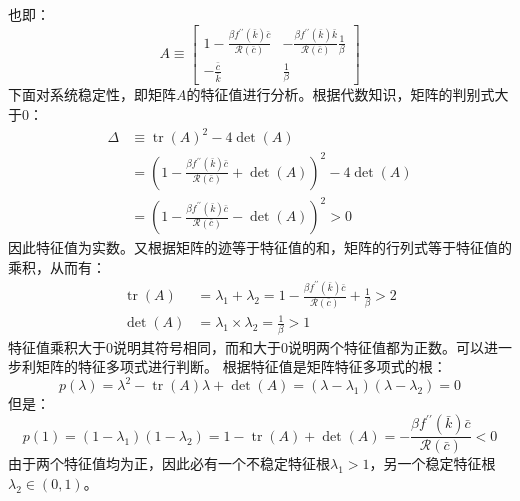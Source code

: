 也即：
\[
    A \equiv
    \begin{bmatrix}
        1-\frac{\beta f^{\prime \prime}(\bar{k}) \bar{c}}{\mathcal{R}(\bar{c})} &
        - \frac{\beta f^{\prime \prime}(\bar{k}) \bar{k}}{\mathcal{R}(\bar{c})} \frac{1}{\beta} \\
        -\frac{\bar{c}}{\bar{k}} & \frac{1}{\beta}
    \end{bmatrix}
\]
下面对系统稳定性，即矩阵$A$的特征值进行分析。根据代数知识，矩阵的判别式大于0：
\begin{equation}
    \begin{aligned}
        \Delta & \equiv \operatorname{tr}(A)^2-4 \operatorname{det}(A) \\
        & =\left(1-\frac{\beta f^{\prime \prime}(\bar{k}) \bar{c}}{\mathcal{R}(\bar{c})}
            +\operatorname{det}(A)\right)^2-4 \operatorname{det}(A) \\
        & =\left(1-\frac{\beta f^{\prime \prime}(\bar{k}) \bar{c}}{\mathcal{R}(\bar{c})}
            -\operatorname{det}(A)\right)^2>0
    \end{aligned}
\end{equation}
因此特征值为实数。又根据矩阵的迹等于特征值的和，矩阵的行列式等于特征值的乘积，从而有：
\begin{equation}
    \begin{aligned}
        \operatorname{tr}(A) & =\lambda_1+\lambda_2 = 
            1-\frac{\beta f^{\prime \prime}(\bar{k}) \bar{c}}{\mathcal{R}(\bar{c})}+\frac{1}{\beta}>2 \\
        \operatorname{det}(A) & =\lambda_1 \times \lambda_2 =\frac{1}{\beta}>1
    \end{aligned}
\end{equation}
特征值乘积大于0说明其符号相同，而和大于0说明两个特征值都为正数。可以进一步利矩阵的特征多项式进行判断。
根据特征值是矩阵特征多项式的根：
\begin{equation*}
    p(\lambda)=\lambda^2-\operatorname{tr}(A) \lambda+\operatorname{det}(A)
        =\left(\lambda-\lambda_1\right)\left(\lambda-\lambda_2\right)=0
\end{equation*}
但是：
\begin{equation*}
    p(1)=\left(1-\lambda_1\right)\left(1-\lambda_2\right)
        =1-\operatorname{tr}(A)+\operatorname{det}(A)
        =-\frac{\beta f^{\prime \prime}(\bar{k}) \bar{c}}{\mathcal{R}(\bar{c})}<0
\end{equation*}
由于两个特征值均为正，因此必有一个不稳定特征根$\lambda_1 > 1$，另一个稳定特征根$\lambda_2 \in (0,1)$。


